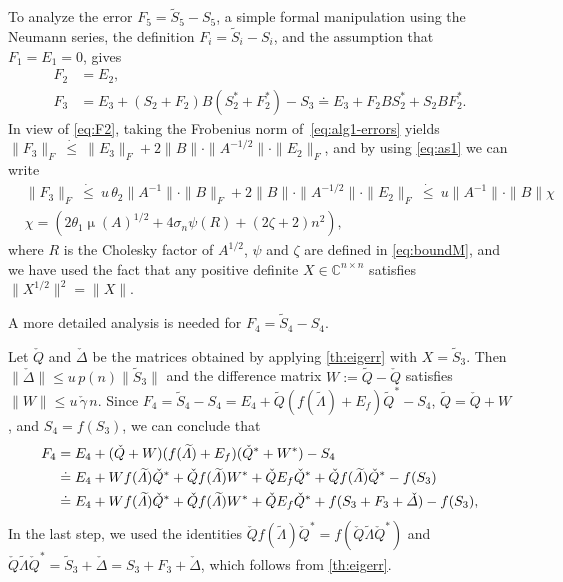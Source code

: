 \documentclass[DIV=14]{scrartcl}
\newcommand\ledot{~\dot{\le}~}
\newcommand{\C}{\ensuremath{\mathbb C}}
\newcommand{\Cnn}{\ensuremath{\C^{n \times n}}}
\theoremstyle{thmstyletwo}
\theoremstyle{definition}
\numberwithin{equation}{section}
\newcommand{\wt}{\widetilde}
\newcommand{\wc}{\check}
\renewcommand{\Delta}{\varDelta}
\DeclareMathOperator{\cond}{\mu}
\renewcommand{\Lambda}{\varLambda}
\begin{document}
{To analyze the error $F_5=\wt S_5-S_5$, a simple formal manipulation using the Neumann series, the definition $F_i=\widetilde S_i-S_i$, and the assumption that $F_1=E_1=0$,  gives
\begin{equation}\label{eq:alg1-errors}
\begin{aligned}
    F_2 &= E_2,\\
    F_3 &= E_3+(S_2+F_2)B(S_2^*+F_2^*)-S_3\doteq E_3+F_2BS_2^*+S_2BF_2^*.
\end{aligned}
\end{equation}
In view of \eqref{eq:F2}, taking the Frobenius norm of~\eqref{eq:alg1-errors} yields
$\|F_3\|_F\ledot \|E_3\|_F+2\|B\|\cdot\|A^{-1/2}\|\cdot\|E_2\|_F$,
and by using \eqref{eq:as1} we can write
\begin{equation}\label{eq:F3}
\begin{split}
&\|F_3\|_F\ledot  u\,\theta_2\|A^{-1}\|\cdot\|B\|_F+2\|B\|\cdot\|A^{-1/2}\|\cdot\|E_2\|_F
\ledot u\|A^{-1}\|\cdot \|B\| \chi\\
&\chi=(2\theta_1\cond(A)^{1/2}+4\sigma_n\psi(R)+
 (2\zeta +2)n^2
),
\end{split}
\end{equation}
where $R$ is the Cholesky factor of $A^{1/2}$,
$\psi$ and $\zeta$ are defined in \eqref{eq:boundM},
and we have used the fact that any positive definite $X \in \Cnn$ satisfies $\| X^{1/2} \|^2 = \|X\|$.

A more detailed analysis is needed for $F_4=\wt S_4-S_4$.




Let $\wc Q$ and $\wc\Delta$ be the matrices obtained by applying \cref{th:eigerr}
with $X=\wt S_3$. Then $\|\wc\Delta\|\le u\, p(n)\|\wt S_3\|$ and the difference matrix
$W:=\wt Q-\wc Q$ satisfies $\|W\|\le u\, \wc\gamma\, n$.
Since $F_4=\wt S_4-S_4=E_4+\wt Q(f(\wt\Lambda)+E_f)\wt Q^*-S_4$,
$\wt Q=\wc Q+W$, and $S_4=f(S_3)$,
we can conclude that
\begin{equation}\label{{eq:alg1-errors1}}
\begin{split}
F_4&=E_4+(\wc Q+W)(f(\wt\Lambda)+E_f)(\wc Q^*+W^*)-S_4\\
   &\doteq E_4 +
   Wf(\wt\Lambda)\wc Q^*+\wc Qf(\wt\Lambda)W^* +\wc Q E_f\wc Q^*+\wc Qf(\wt\Lambda)\wc Q^*-f(S_3) \\
   &\doteq E_4+
   Wf(\wt\Lambda)\wc Q^*+\wc Qf(\wt\Lambda)W^* +\wc Q E_f\wc Q^* +f(S_3+F_3+\wc\Delta)-f(S_3)
,
\end{split}
\end{equation}
In the last step, we used the identities
$\wc Qf(\wt\Lambda)\wc Q^*=f(\wc Q\wt\Lambda\wc Q^*)$ and
$\wc Q\wt\Lambda\wc Q^* = \wt S_3+\wc\Delta =S_3+F_3+\wc\Delta$,
which follows from \cref{th:eigerr}.

}
\end{document}
